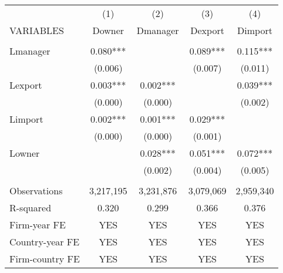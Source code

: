 \begin{tabular}{lcccc} \hline
 & (1) & (2) & (3) & (4) \\
VARIABLES & Downer & Dmanager & Dexport & Dimport \\ \hline
 &  &  &  &  \\
Lmanager & 0.080*** &  & 0.089*** & 0.115*** \\
 & (0.006) &  & (0.007) & (0.011) \\
Lexport & 0.003*** & 0.002*** &  & 0.039*** \\
 & (0.000) & (0.000) &  & (0.002) \\
Limport & 0.002*** & 0.001*** & 0.029*** &  \\
 & (0.000) & (0.000) & (0.001) &  \\
Lowner &  & 0.028*** & 0.051*** & 0.072*** \\
 &  & (0.002) & (0.004) & (0.005) \\
 &  &  &  &  \\
Observations & 3,217,195 & 3,231,876 & 3,079,069 & 2,959,340 \\
R-squared & 0.320 & 0.299 & 0.366 & 0.376 \\
Firm-year FE & YES & YES & YES & YES \\
Country-year FE & YES & YES & YES & YES \\
 Firm-country FE & YES & YES & YES & YES \\ \hline
\end{tabular}
